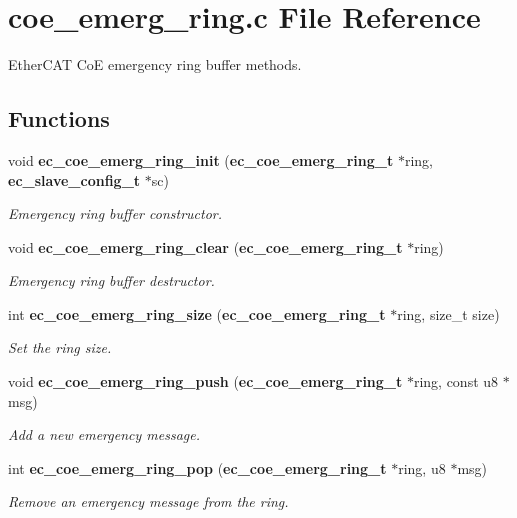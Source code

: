\section{coe\-\_\-emerg\-\_\-ring.\-c \-File \-Reference}
\label{coe__emerg__ring_8c}


\-Ether\-C\-A\-T \-Co\-E emergency ring buffer methods.  


\subsection*{\-Functions}
\begin{DoxyCompactItemize}
\item 
void {\bf ec\-\_\-coe\-\_\-emerg\-\_\-ring\-\_\-init} ({\bf ec\-\_\-coe\-\_\-emerg\-\_\-ring\-\_\-t} $\ast$ring, {\bf ec\-\_\-slave\-\_\-config\-\_\-t} $\ast$sc)
\begin{DoxyCompactList}\small\item\em \-Emergency ring buffer constructor. \end{DoxyCompactList}\item 
void {\bf ec\-\_\-coe\-\_\-emerg\-\_\-ring\-\_\-clear} ({\bf ec\-\_\-coe\-\_\-emerg\-\_\-ring\-\_\-t} $\ast$ring)
\begin{DoxyCompactList}\small\item\em \-Emergency ring buffer destructor. \end{DoxyCompactList}\item 
int {\bf ec\-\_\-coe\-\_\-emerg\-\_\-ring\-\_\-size} ({\bf ec\-\_\-coe\-\_\-emerg\-\_\-ring\-\_\-t} $\ast$ring, size\-\_\-t size)
\begin{DoxyCompactList}\small\item\em \-Set the ring size. \end{DoxyCompactList}\item 
void {\bf ec\-\_\-coe\-\_\-emerg\-\_\-ring\-\_\-push} ({\bf ec\-\_\-coe\-\_\-emerg\-\_\-ring\-\_\-t} $\ast$ring, const u8 $\ast$msg)
\begin{DoxyCompactList}\small\item\em \-Add a new emergency message. \end{DoxyCompactList}\item 
int {\bf ec\-\_\-coe\-\_\-emerg\-\_\-ring\-\_\-pop} ({\bf ec\-\_\-coe\-\_\-emerg\-\_\-ring\-\_\-t} $\ast$ring, u8 $\ast$msg)
\begin{DoxyCompactList}\small\item\em \-Remove an emergency message from the ring. \end{DoxyCompactList}\item 

\end{DoxyCompactItemize}
